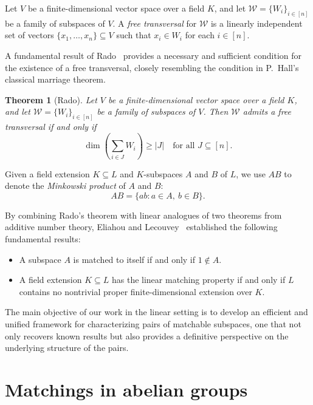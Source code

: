 \documentclass[11pt]{amsart}
\newtheorem{theorem}{Theorem}[section]
\theoremstyle{definition}
\theoremstyle{remark}
\begin{document}
Let \( V \) be a finite-dimensional vector space over a field \( K \), and let \( \mathcal{W} = \{ W_i \}_{i \in [n]} \) be a family of subspaces of \( V \). A \emph{free transversal} for \( \mathcal{W} \) is a linearly independent set of vectors \( \{x_1, \ldots, x_n\} \subseteq V \) such that \( x_i \in W_i \) for each \( i \in [n] \).

A fundamental result of Rado~\cite{Rado} provides a necessary and sufficient condition for the existence of a free transversal, closely resembling the condition in P.\ Hall’s classical marriage theorem. 


\begin{theorem}[Rado]\label{Linear Hall}
Let \( V \) be a finite-dimensional vector space over a field \( K \), and let \( \mathcal{W} =  \{ W_i \}_{i \in [n]} \) be a family of subspaces of \( V \). Then \( \mathcal{W} \) admits a free transversal if and only if
\[
\dim\left( \sum_{i \in J} W_i \right) \geq |J| \quad \text{for all } J \subseteq [n].
\]
\end{theorem}


Given a field extension \( K \subseteq L \) and \( K \)-subspaces \( A \) and \( B \) of \( L \), we use \( AB \) to denote the \emph{Minkowski product} of \( A \) and \( B \):
\[
AB = \{ ab : a \in A,\ b \in B \}.
\]

\medskip

By combining Rado's theorem with linear analogues of two theorems from additive number theory, Eliahou and Lecouvey~\cite{Eliahou 2} established the following fundamental results:
\begin{itemize}
    \item A subspace \( A \) is matched to itself if and only if \( 1 \notin A \).
    \item A field extension \( K \subseteq L \) has the linear matching property if and only if \( L \) contains no nontrivial proper finite-dimensional extension over \( K \).
\end{itemize}

The main objective of our work in the linear setting is to develop an efficient and unified framework for characterizing pairs of matchable subspaces, one that not only recovers known results but also provides a definitive perspective on the underlying structure of the pairs.
 



\section{Matchings in abelian groups} \label{MIBG}
\end{document}
